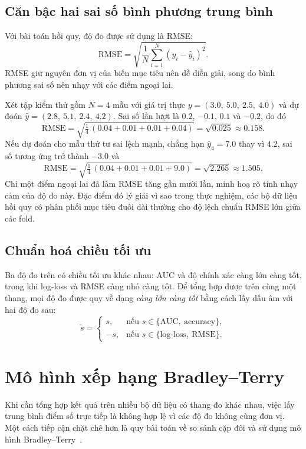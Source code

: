 \subsection{Căn bậc hai sai số bình phương trung bình}
Với bài toán hồi quy, độ đo được sử dụng là RMSE:
\[
    \text{RMSE} = \sqrt{\frac{1}{N}\sum_{i=1}^{N}\left(y_i - \hat{y}_i\right)^2}.
\]
RMSE giữ nguyên đơn vị của biến mục tiêu nên dễ diễn giải, song do bình phương sai
số nên nhạy với các điểm ngoại lai.

\begin{vidu}
\label{vd:rmse}
Xét tập kiểm thử gồm $N = 4$ mẫu với giá trị thực $y = (3.0,\ 5.0,\ 2.5,\ 4.0)$ và
dự đoán $\hat{y} = (2.8,\ 5.1,\ 2.4,\ 4.2)$. Sai số lần lượt là $0.2$, $-0.1$,
$0.1$ và $-0.2$, do đó
\[
    \text{RMSE} = \sqrt{\tfrac{1}{4}\,(0.04 + 0.01 + 0.01 + 0.04)}
    = \sqrt{0.025} \approx 0.158.
\]
Nếu dự đoán cho mẫu thứ tư sai lệch mạnh, chẳng hạn $\hat{y}_4 = 7.0$ thay vì
$4.2$, sai số tương ứng trở thành $-3.0$ và
\[
    \text{RMSE} = \sqrt{\tfrac{1}{4}\,(0.04 + 0.01 + 0.01 + 9.0)}
    = \sqrt{2.265} \approx 1.505.
\]
Chỉ một điểm ngoại lai đã làm RMSE tăng gần mười lần, minh hoạ rõ tính nhạy cảm
của độ đo này. Đặc điểm đó lý giải vì sao trong thực nghiệm, các bộ dữ liệu hồi
quy có phân phối mục tiêu đuôi dài thường cho độ lệch chuẩn RMSE lớn giữa các fold.
\end{vidu}

\subsection{Chuẩn hoá chiều tối ưu}
Ba độ đo trên có chiều tối ưu khác nhau: AUC và độ chính xác càng lớn càng tốt,
trong khi log-loss và RMSE càng nhỏ càng tốt. Để tổng hợp được trên cùng một
thang, mọi độ đo được quy về dạng \emph{càng lớn càng tốt} bằng cách lấy dấu âm với
hai độ đo sau:
\[
    \tilde{s} =
    \begin{cases}
        s, & \text{nếu } s \in \{\mathrm{AUC},\ \text{accuracy}\},\\[2pt]
        -s, & \text{nếu } s \in \{\text{log-loss},\ \text{RMSE}\}.
    \end{cases}
\]

\section{Mô hình xếp hạng Bradley--Terry}
\label{sec:bt}
Khi cần tổng hợp kết quả trên nhiều bộ dữ liệu có thang đo khác nhau, việc lấy
trung bình điểm số trực tiếp là không hợp lệ vì các độ đo không cùng đơn vị. Một
cách tiếp cận chặt chẽ hơn là quy bài toán về so sánh cặp đôi và sử dụng mô hình
Bradley--Terry~\cite{bradley1952rank}.

